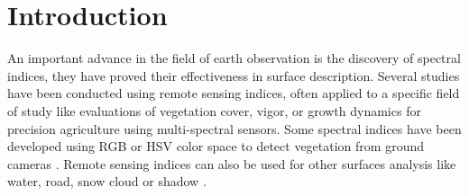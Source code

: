 \documentclass[../thesis.tex]{subfiles}
\begin{document}
	\newpage
	\section{Introduction}
	An important advance in the field of earth observation is the discovery of spectral indices, they have proved their effectiveness in surface description. Several studies have been conducted using remote sensing indices, often applied to a specific field of study like evaluations of vegetation cover, vigor, or growth dynamics \cite{SignificantVegetationIndices, ComparisonSentinel2, ReviewVegetationIndices, w13040547} for precision agriculture using multi-spectral sensors. Some spectral indices have been developed using RGB or HSV color space to detect vegetation from ground cameras \cite{LeeSegmentation, Milioto2017, HassaneinVegetation}. %
	Remote sensing indices {can also be used for other surfaces analysis like water, road, snow \cite{rs11232774} cloud \cite{ZHAI2018235} or shadow \cite{henrich2009development}.}
	
\end{document}
